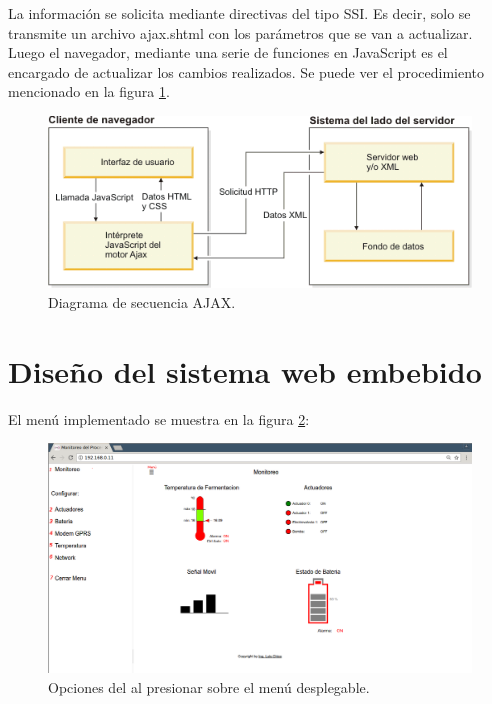 La información se solicita mediante directivas del tipo SSI.
Es decir, solo se transmite un archivo ajax.shtml con los parámetros que se van a actualizar. Luego el navegador, mediante una serie de funciones en JavaScript es el encargado de actualizar los cambios realizados.  
Se puede ver el procedimiento mencionado en la figura \ref{fig:ajax_sec}.
\begin{figure}[!htb]
  \centering
  \includegraphics[scale=.8]{./Figures/ajax_sec.png}
  \caption{Diagrama de secuencia AJAX.}
  \label{fig:ajax_sec}
\end{figure}



\section{Diseño del sistema web embebido}
El menú implementado se muestra en la figura \ref{fig:web_menus_num}:

\begin{figure}[h]
  \centering
  \includegraphics[scale=.25]{./Figures/web_menus_num.png}
  \caption{Opciones del al presionar sobre el menú desplegable.}
  \label{fig:web_menus_num}
\end{figure}

